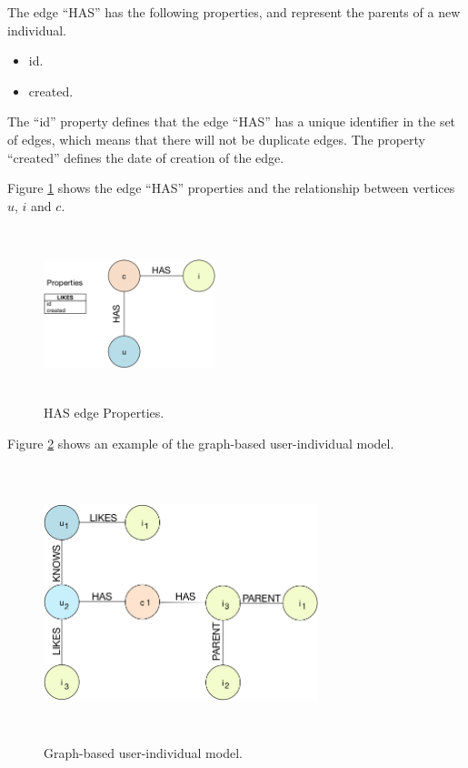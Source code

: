The edge “HAS” has the following properties, and represent the parents of a new individual.
\begin{itemize}
\item id.
\item created.
\end{itemize}

The “id” property defines that the edge “HAS” has a unique identifier in the set
of edges, which means that there will not be duplicate edges. The property
“created” defines the date of creation of the edge.

Figure \ref{fig:Has_edge} shows the edge “HAS” properties and the relationship
between vertices $u$, $i$ and $c$.

\begin{figure}
\captionsetup{justification=centering,margin=2cm}
\centering
\setlength\fboxsep{0pt}
\setlength\fboxrule{0.7pt}
\includegraphics[width=5cm,height=5cm,keepaspectratio]{img/edge_properties_has.png}
\caption{HAS edge Properties.}
\label{fig:Has_edge}
\end{figure}


Figure \ref{fig:user_moder} shows an example of the graph-based
user-individual model.

\begin{figure}
\captionsetup{justification=centering,margin=2cm}
\centering
\setlength\fboxsep{0pt}
\setlength\fboxrule{0.7pt}
\includegraphics[width=8cm,height=8cm,keepaspectratio]{img/model_representation.png}
\caption{Graph-based user-individual model.}
\label{fig:user_moder}
\end{figure}
